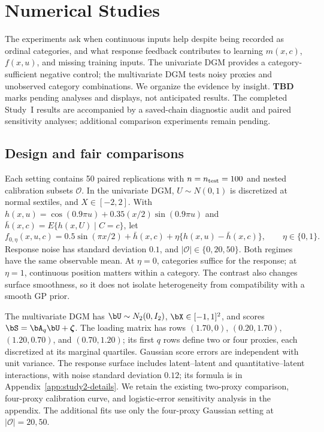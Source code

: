 \section{Numerical Studies}
\label{sec:numerical-studies}

The experiments ask when continuous inputs help despite being recorded as ordinal categories, and what response feedback contributes to learning $m(x,c)$, $f(x,u)$, and missing training inputs. The univariate DGM provides a category-sufficient negative control; the multivariate DGM tests noisy proxies and unobserved category combinations. We organize the evidence by insight. \textbf{TBD} marks pending analyses and displays, not anticipated results. The completed Study~I results are accompanied by a saved-chain diagnostic audit and paired sensitivity analyses; additional comparison experiments remain pending.

\subsection{Design and fair comparisons}
\label{sec:simulation-protocol}
\label{sec:sim-univariate-deterministic}
Each setting contains 50 paired replications with $n=n_{\rm test}=100$ and nested calibration subsets $\mathcal O$. In the univariate DGM, $U\sim N(0,1)$ is discretized at normal sextiles, and $X\in[-2,2]$. With $h(x,u)=\cos(0.9\pi u)+0.35(x/2)\sin(0.9\pi u)$ and $\bar h(x,c)=E\{h(x,U)\mid C=c\}$, let
\begin{equation}
\label{eq:study1-heterogeneity-dgm-main}
 f_{0,\eta}(x,u,c)=0.5\sin(\pi x/2)+\bar h(x,c)
                 +\eta\{h(x,u)-\bar h(x,c)\},\qquad \eta\in\{0,1\}.
\end{equation}
Response noise has standard deviation $0.1$, and $|\mathcal O|\in\{0,20,50\}$. Both regimes have the same observable mean. At $\eta=0$, categories suffice for the response; at $\eta=1$, continuous position matters within a category. The contrast also changes surface smoothness, so it does not isolate heterogeneity from compatibility with a smooth GP prior.

\label{sec:sim-multivariate-probit}
The multivariate DGM has $\bU\sim N_2(0,I_2)$, $\bX\in[-1,1]^2$, and scores $\bS=\bA_q\bU+\boldsymbol\zeta$. The loading matrix has rows $(1.70,0)$, $(0.20,1.70)$, $(1.20,0.70)$, and $(0.70,1.20)$; its first $q$ rows define two or four proxies, each discretized at its marginal quartiles. Gaussian score errors are independent with unit variance. The response surface includes latent--latent and quantitative--latent interactions, with noise standard deviation $0.12$; its formula is in Appendix~\ref{app:study2-details}. We retain the existing two-proxy comparison, four-proxy calibration curve, and logistic-error sensitivity analysis in the appendix. The additional fits use only the four-proxy Gaussian setting at $|\mathcal O|=20,50$.

